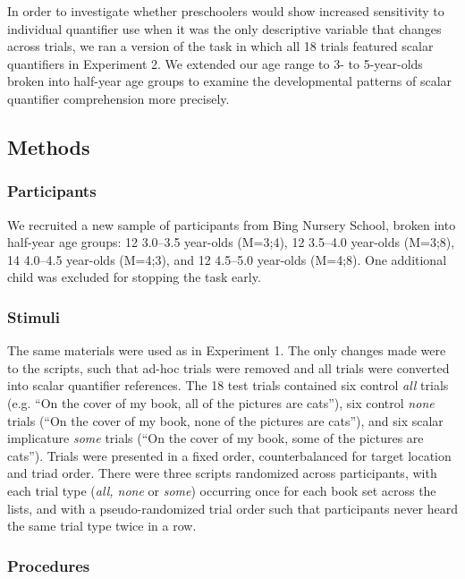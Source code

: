 \documentclass[10pt,letterpaper]{article}
\begin{document}
In order to investigate whether preschoolers would show increased sensitivity to individual quantifier use when it was the only descriptive variable that changes across trials, we ran a version of the task in which all 18 trials featured scalar quantifiers in Experiment 2. We extended our age range to 3- to 5-year-olds broken into half-year age groups to examine the developmental patterns of scalar quantifier comprehension more precisely. 

\subsection{Methods}

\subsubsection{Participants}

We recruited a new sample of participants from Bing Nursery School, broken into half-year age groups: 12 3.0--3.5 year-olds (M=3;4), 12 3.5--4.0 year-olds (M=3;8), 14 4.0--4.5 year-olds (M=4;3), and 12 4.5--5.0 year-olds (M=4;8).  One additional child was excluded for stopping the task early. 

\subsubsection{Stimuli}

The same materials were used as in Experiment 1.  The only changes made were to the scripts, such that ad-hoc trials were removed and all trials were converted into scalar quantifier references.  The 18 test trials contained six control \emph{all} trials (e.g. ``On the cover of my book, all of the pictures are cats''), six control \emph{none} trials (``On the cover of my book, none of the pictures are cats''), and six scalar implicature \emph{some} trials (``On the cover of my book, some of the pictures are cats'').  Trials were presented in a fixed order, counterbalanced for target location and triad order.  There were three scripts randomized across participants, with each trial type (\emph{all, none} or \emph{some}) occurring once for each book set across the lists, and with a pseudo-randomized trial order such that participants never heard the same trial type twice in a row. 

\subsubsection{Procedures}
\end{document}
